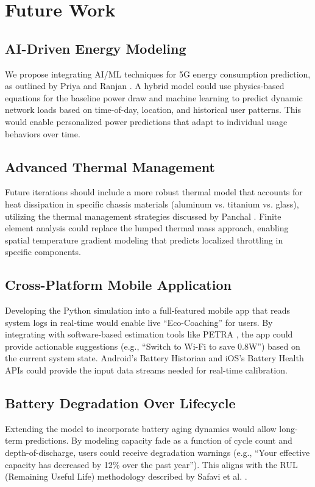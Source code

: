 \documentclass[12pt]{article}
\begin{document}
\section{Future Work}

\subsection{AI-Driven Energy Modeling}
We propose integrating AI/ML techniques for 5G energy consumption prediction, as outlined by Priya and Ranjan \cite{4}. A hybrid model could use physics-based equations for the baseline power draw and machine learning to predict dynamic network loads based on time-of-day, location, and historical user patterns. This would enable personalized power predictions that adapt to individual usage behaviors over time.

\subsection{Advanced Thermal Management}
Future iterations should include a more robust thermal model that accounts for heat dissipation in specific chassis materials (aluminum vs. titanium vs. glass), utilizing the thermal management strategies discussed by Panchal \cite{14}. Finite element analysis could replace the lumped thermal mass approach, enabling spatial temperature gradient modeling that predicts localized throttling in specific components.

\subsection{Cross-Platform Mobile Application}
Developing the Python simulation into a full-featured mobile app that reads system logs in real-time would enable live ``Eco-Coaching'' for users. By integrating with software-based estimation tools like PETRA \cite{15}, the app could provide actionable suggestions (e.g., ``Switch to Wi-Fi to save 0.8W'') based on the current system state. Android's Battery Historian and iOS's Battery Health APIs could provide the input data streams needed for real-time calibration.

\subsection{Battery Degradation Over Lifecycle}
Extending the model to incorporate battery aging dynamics would allow long-term predictions. By modeling capacity fade as a function of cycle count and depth-of-discharge, users could receive degradation warnings (e.g., ``Your effective capacity has decreased by 12\% over the past year''). This aligns with the RUL (Remaining Useful Life) methodology described by Safavi et al. \cite{8}.
\end{document}
